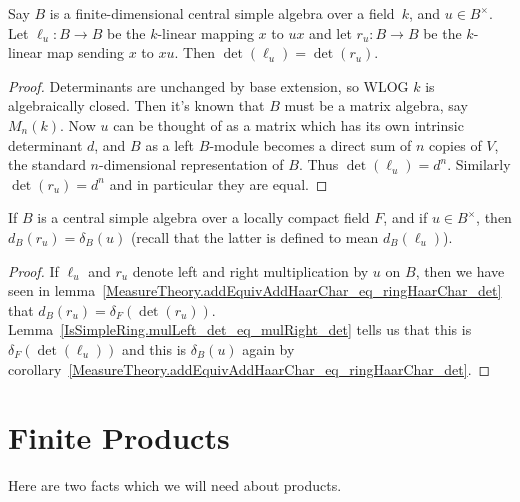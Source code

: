 \begin{lemma}
  \label{IsSimpleRing.mulLeft_det_eq_mulRight_det}
  \leanok
  Say $B$ is a finite-dimensional central simple algebra over a field~$k$,
  and $u\in B^\times$. Let $\ell_u:B\to B$ be the $k$-linear mapping $x$ to $ux$ and
  let $r_u:B\to B$ be the $k$-linear map sending $x$ to $xu$. Then
  $\det(\ell_u)=\det(r_u)$.
\end{lemma}
\begin{proof}
  \leanok
  Determinants are unchanged by base extension, so WLOG $k$ is algebraically closed.
  Then it's known that $B$ must be a matrix algebra, say $M_n(k)$. Now $u$ can be thought
  of as a matrix which has its own intrinsic determinant $d$, and $B$ as a left $B$-module
  becomes a direct sum of $n$ copies of $V$, the standard $n$-dimensional representation of $B$.
  Thus $\det(\ell_u)=d^n$. Similarly $\det(r_u)=d^n$ and in particular they are equal.
\end{proof}

\begin{corollary}
  \label{IsSimpleRing.ringHaarChar_eq_addEquivAddHaarChar_mulRight}
  \leanok
  If $B$ is a central simple algebra over a locally compact field $F$, and if $u\in B^\times$,
  then $d_B(r_u)=\delta_B(u)$ (recall that the latter is defined to mean $d_B(\ell_u)$).
\end{corollary}
\begin{proof}
  \leanok
  If $\ell_u$ and $r_u$ denote left and right multiplication by $u$ on $B$, then we have
  seen in lemma~\ref{MeasureTheory.addEquivAddHaarChar_eq_ringHaarChar_det} that $d_B(r_u)=\delta_F(\det(r_u))$.
  Lemma~\ref{IsSimpleRing.mulLeft_det_eq_mulRight_det} tells
  us that this is $\delta_F(\det(\ell_u))$ and this is $\delta_B(u)$ again by
  corollary~\ref{MeasureTheory.addEquivAddHaarChar_eq_ringHaarChar_det}.
\end{proof}

\section{Finite Products}

Here are two facts which we will need about products.

